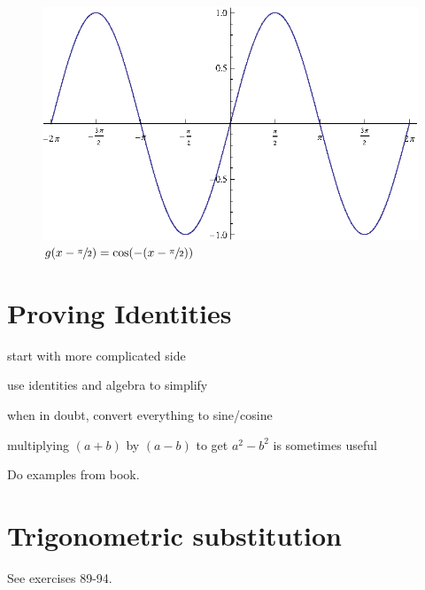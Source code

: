 \documentclass{exam}
\begin{document}
  \begin{figure}[H]
    \centering
    \includegraphics[scale=0.7]{sine_x}
    \caption{$g(x - \sfrac{\pi}{2}) = \cos(- ( x - \sfrac{\pi}{2}))$}
  \end{figure}

  \section{Proving Identities}

  \begin{itemize*}
    \item start with more complicated side
    \item use identities and algebra to simplify
    \item when in doubt, convert everything to sine/cosine
    \item multiplying $(a + b)$ by $(a - b)$ to get $a^2 - b^2$ is sometimes useful
  \end{itemize*}

  Do examples from book.

  \section{Trigonometric substitution}
  See exercises 89-94.  
\end{document}
